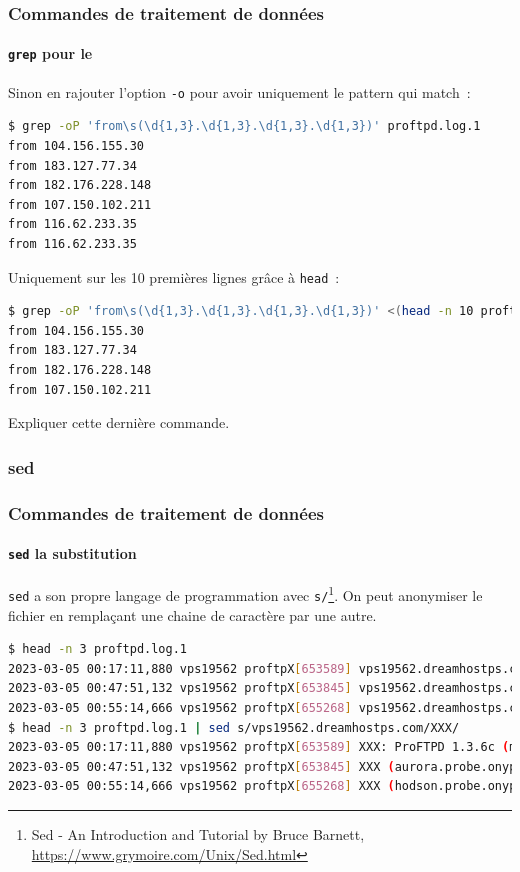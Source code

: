 \documentclass{beamer}
\begin{document}
    \begin{frame}[fragile]
        \transdissolve
        \frametitle{Commandes de traitement de données}
        \framesubtitle{\lstinline{grep} pour le }
        Sinon en rajouter l'option \lstinline{-o} pour avoir uniquement le pattern qui match~:
        \begin{lstlisting}[language=bash]
$ grep -oP 'from\s(\d{1,3}.\d{1,3}.\d{1,3}.\d{1,3})' proftpd.log.1
from 104.156.155.30
from 183.127.77.34
from 182.176.228.148
from 107.150.102.211
from 116.62.233.35
from 116.62.233.35
        \end{lstlisting}
        Uniquement sur les 10 premières lignes grâce à \lstinline{head}~:
        \begin{lstlisting}[language=bash]
$ grep -oP 'from\s(\d{1,3}.\d{1,3}.\d{1,3}.\d{1,3})' <(head -n 10 proftpd.log.1)
from 104.156.155.30
from 183.127.77.34
from 182.176.228.148
from 107.150.102.211
        \end{lstlisting}
        Expliquer cette dernière commande.
    \end{frame}

    \subsubsection{sed}\label{subsubsec:sed}
    \begin{frame}[fragile]
        \transdissolve
        \frametitle{Commandes de traitement de données}
        \framesubtitle{\lstinline{sed} la substitution}
        \lstinline{sed} a son propre langage de programmation avec \lstinline{s/}\footnote{\label{sed}Sed - An Introduction and Tutorial by Bruce Barnett, \url{https://www.grymoire.com/Unix/Sed.html}}.
        \bigbreak
        On peut anonymiser le fichier en remplaçant une chaine de caractère par une autre.
        \begin{lstlisting}[language=bash,basicstyle=\tiny\ttfamily]
$ head -n 3 proftpd.log.1
2023-03-05 00:17:11,880 vps19562 proftpX[653589] vps19562.dreamhostps.com: ProFTPD 1.3.6c (maint) (built Thu Feb 27 2020 19:34:56 UTC) standalone mode STARTUP
2023-03-05 00:47:51,132 vps19562 proftpX[653845] vps19562.dreamhostps.com (aurora.probe.onyphe.net[142.4.218.114]): USER anonymous: no such user found from aurora.probe.onyphe.net [142.4.218.114] to ::ffff:66.33.201.239:21
2023-03-05 00:55:14,666 vps19562 proftpX[655268] vps19562.dreamhostps.com (hodson.probe.onyphe.net[178.32.197.87]): USER anonymous: no such user found from hodson.probe.onyphe.net [178.32.197.87] to ::ffff:66.33.201.239:21
$ head -n 3 proftpd.log.1 | sed s/vps19562.dreamhostps.com/XXX/
2023-03-05 00:17:11,880 vps19562 proftpX[653589] XXX: ProFTPD 1.3.6c (maint) (built Thu Feb 27 2020 19:34:56 UTC) standalone mode STARTUP
2023-03-05 00:47:51,132 vps19562 proftpX[653845] XXX (aurora.probe.onyphe.net[142.4.218.114]): USER anonymous: no such user found from aurora.probe.onyphe.net [142.4.218.114] to ::ffff:66.33.201.239:21
2023-03-05 00:55:14,666 vps19562 proftpX[655268] XXX (hodson.probe.onyphe.net[178.32.197.87]): USER anonymous: no such user found from hodson.probe.onyphe.net [178.32.197.87] to ::ffff:66.33.201.239:21
        \end{lstlisting}
    \end{frame}
\end{document}
